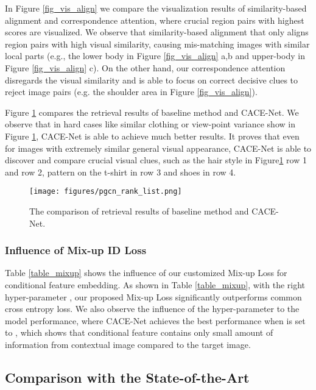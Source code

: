 \documentclass[final]{cvpr}
\begin{document}
In Figure \ref{fig_vis_align} we compare the visualization results of similarity-based alignment and correspondence attention, where crucial region pairs with highest scores are visualized. We observe that similarity-based alignment that  only aligns region pairs with high visual similarity, causing mis-matching images with similar local parts (e.g.,  the lower body in Figure \ref{fig_vis_align} a,b and upper-body in Figure \ref{fig_vis_align} c). On the other hand, our correspondence attention disregards the visual similarity and is able to focus on correct decisive clues to reject image pairs (e.g. the shoulder area in Figure \ref{fig_vis_align}). 

Figure \ref{fig_vis_ranklist} compares the retrieval results of baseline method and CACE-Net. We observe that in hard cases like similar clothing or view-point variance show in Figure \ref{fig_vis_ranklist}, CACE-Net is able to achieve much better results. It proves that even for images with extremely similar general visual appearance,  CACE-Net is able to discover and compare crucial visual clues, such as the hair style in Figure\ref{fig_vis_ranklist} row 1 and row 2, pattern on the t-shirt in row 3 and shoes in row 4. 

\begin{figure}[t]
\centering
\texttt{[image: figures/pgcn\_rank\_list.png]} \caption{The comparison of retrieval results of baseline method and CACE-Net. }
\label{fig_vis_ranklist}
\end{figure}

\subsubsection{Influence of Mix-up ID Loss}
Table \ref{table_mixup} shows the influence of our customized Mix-up Loss for conditional feature embedding. As shown in Table \ref{table_mixup}, with the right hyper-parameter , our proposed Mix-up Loss significantly outperforms common cross entropy loss. We also observe the influence of the hyper-parameter  to the model performance, where CACE-Net achieves the best performance when  is set to , which shows that  conditional feature contains only small amount of information from contextual image compared to the target image. 


\subsection{Comparison with the State-of-the-Art}
\end{document}

